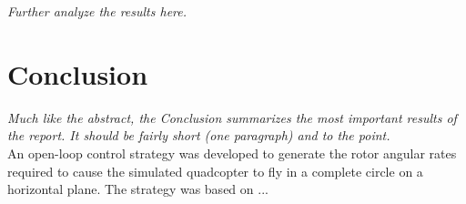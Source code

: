 \documentclass[11pt]{article}
\begin{document}
\emph{Further analyze the results here.}

\section{Conclusion}
\emph{Much like the abstract, the Conclusion summarizes the most important
  results of the report.  It should be fairly short (one paragraph) and to the
  point.} \\

An open-loop control strategy was developed to generate the rotor
angular rates required to cause the simulated quadcopter to fly in a complete
circle on a horizontal plane.  The strategy was based on ...


  
\end{document}
